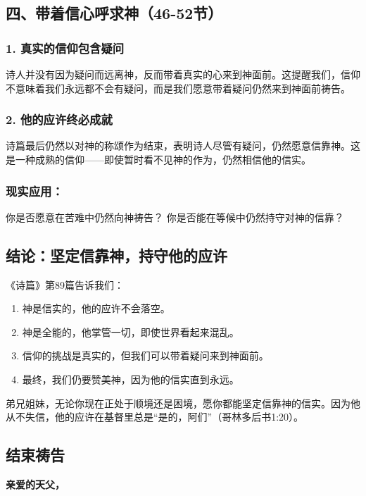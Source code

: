 \documentclass[a4paper, 12pt]{article}
\begin{document}
\subsection*{四、带着信心呼求神（46-52节）}

\subsubsection*{1. 真实的信仰包含疑问}
诗人并没有因为疑问而远离神，反而带着真实的心来到神面前。这提醒我们，信仰不意味着我们永远都不会有疑问，而是我们愿意带着疑问仍然来到神面前祷告。

\subsubsection*{2. 他的应许终必成就}
诗篇最后仍然以对神的称颂作为结束，表明诗人尽管有疑问，仍然愿意信靠神。这是一种成熟的信仰——即使暂时看不见神的作为，仍然相信他的信实。

\subsubsection*{现实应用：}
你是否愿意在苦难中仍然向神祷告？
你是否能在等候中仍然持守对神的信靠？
\subsection*{结论：坚定信靠神，持守他的应许}
《诗篇》第89篇告诉我们：
\begin{enumerate}
    \item 神是信实的，他的应许不会落空。

    \item 神是全能的，他掌管一切，即使世界看起来混乱。

    \item 信仰的挑战是真实的，但我们可以带着疑问来到神面前。

    \item 最终，我们仍要赞美神，因为他的信实直到永远。

\end{enumerate}

弟兄姐妹，无论你现在正处于顺境还是困境，愿你都能坚定信靠神的信实。因为他从不失信，他的应许在基督里总是“是的，阿们”（哥林多后书1:20）。

\subsection*{结束祷告}
\textbf{亲爱的天父，}
\end{document}
